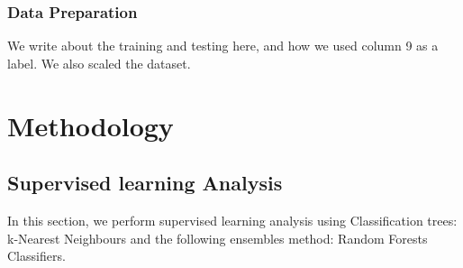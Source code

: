 \documentclass[12pt]{article}
\begin{document}
\begin{enumerate}
	
	
		
		
		
		
		
	
	
	
		
		
		
		
		
	
	
	
		
		
		
		
		
		
\end{enumerate}
 

\subsubsection{Data Preparation} 

We write about the training and testing here, and how we used column 9 as a label. We also scaled the dataset.\\

\section{Methodology}
\subsection{Supervised learning Analysis} 
 In this section, we perform supervised learning analysis using Classification trees: k-Nearest Neighbours and the following ensembles method: Random Forests Classifiers.\cite{zhou2012ensemble}
 
\end{document}
